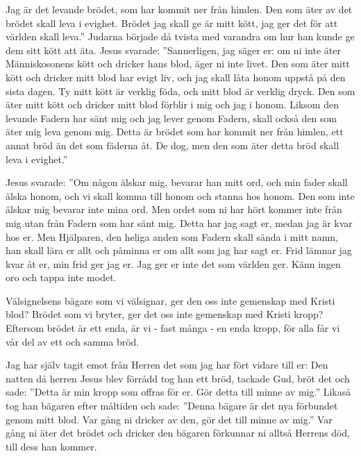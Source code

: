 
Jag är det levande brödet, som har kommit ner från himlen. Den som äter av det brödet skall leva i evighet. Brödet jag skall ge är mitt kött, jag ger det för att världen skall leva.”
Judarna började då tvista med varandra om hur han kunde ge dem sitt kött att äta.
Jesus svarade: ”Sannerligen, jag säger er: om ni inte äter Människosonens kött och dricker hans blod, äger ni inte livet.
Den som äter mitt kött och dricker mitt blod har evigt liv, och jag skall låta honom uppstå på den sista dagen.
Ty mitt kött är verklig föda, och mitt blod är verklig dryck.
Den som äter mitt kött och dricker mitt blod förblir i mig och jag i honom.
Liksom den levande Fadern har sänt mig och jag lever genom Fadern, skall också den som äter mig leva genom mig.
Detta är brödet som har kommit ner från himlen, ett annat bröd än det som fäderna åt. De dog, men den som äter detta bröd skall leva i evighet.”




Jesus svarade: ”Om någon älskar mig, bevarar han mitt ord, och min fader skall älska honom, och vi skall komma till honom och stanna hos honom.
Den som inte älskar mig bevarar inte mina ord. Men ordet som ni har hört kommer inte från mig utan från Fadern som har sänt mig.
Detta har jag sagt er, medan jag är kvar hos er.
Men Hjälparen, den heliga anden som Fadern skall sända i mitt namn, han skall lära er allt och påminna er om allt som jag har sagt er.
Frid lämnar jag kvar åt er, min frid ger jag er. Jag ger er inte det som världen ger. Känn ingen oro och tappa inte modet.


Välsignelsens bägare som vi välsignar, ger den oss inte gemenskap med Kristi blod? Brödet som vi bryter, ger det oss inte gemenskap med Kristi kropp?
Eftersom brödet är ett enda, är vi - fast många - en enda kropp, för alla får vi vår del av ett och samma bröd.


Jag har själv tagit emot från Herren det som jag har fört vidare till er: Den natten då herren Jesus blev förrådd tog han ett bröd,
tackade Gud, bröt det och sade: ”Detta är min kropp som offras för er. Gör detta till minne av mig.”
Likaså tog han bägaren efter måltiden och sade: ”Denna bägare är det nya förbundet genom mitt blod. Var gång ni dricker av den, gör det till minne av mig.”
Var gång ni äter det brödet och dricker den bägaren förkunnar ni alltså Herrens död, till dess han kommer.

